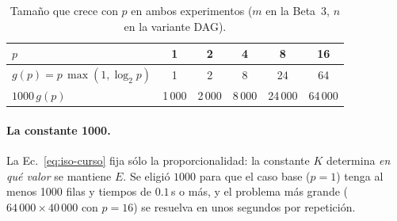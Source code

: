 \documentclass[11pt,a4paper]{article}
\newcommand{\ntr}{n}   %
\newcommand{\mte}{m}   %
\begin{document}
\begin{table}[H]
\centering
\caption{Tamaño que crece con $p$ en ambos experimentos ($\mte$ en la Beta~3, $\ntr$ en la
variante DAG).}
\label{tab:iso-diseno}
\begin{tabular}{lccccc}
\toprule
$p$ & 1 & 2 & 4 & 8 & 16\\
\midrule
$g(p)=p\,\max(1,\log_2 p)$ & 1 & 2 & 8 & 24 & 64\\
$1000\,g(p)$ & 1\,000 & 2\,000 & 8\,000 & 24\,000 & 64\,000\\
\bottomrule
\end{tabular}
\end{table}

\paragraph{La constante 1000.}
La Ec.~\eqref{eq:iso-curso} fija sólo la proporcionalidad: la constante $K$ determina \emph{en qué
valor} se mantiene $E$. Se eligió $1000$ para que el caso base ($p=1$) tenga al menos 1000 filas y
tiempos de $0.1$\,s o más, y el problema más grande ($64\,000\times40\,000$ con $p=16$) se resuelva
en unos segundos por repetición.

\end{document}
